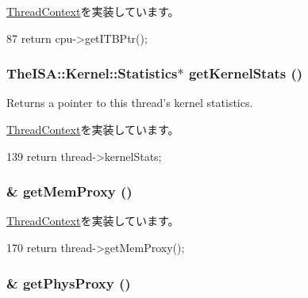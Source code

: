 \hyperlink{classThreadContext_aaae22e0dcf2f312619915bbf34509ba4}{ThreadContext}を実装しています。


\begin{DoxyCode}
87 { return cpu->getITBPtr(); }
\end{DoxyCode}
\hypertarget{classInOrderThreadContext_a3faa5e314c06241296ab582bb891a06a}{
\subsubsection[{getKernelStats}]{\setlength{\rightskip}{0pt plus 5cm}TheISA::Kernel::Statistics$\ast$ getKernelStats ()}}
\label{classInOrderThreadContext_a3faa5e314c06241296ab582bb891a06a}
Returns a pointer to this thread's kernel statistics. 

\hyperlink{classThreadContext_a85141770510cf256c27f10adece17ed5}{ThreadContext}を実装しています。


\begin{DoxyCode}
139     { return thread->kernelStats; }
\end{DoxyCode}
\hypertarget{classInOrderThreadContext_ab07f5af63c9d22e504dfe620c0a07228}{
\subsubsection[{getMemProxy}]{\& getMemProxy ()}}
\label{classInOrderThreadContext_ab07f5af63c9d22e504dfe620c0a07228}


\hyperlink{classThreadContext_a840e8764d04f2a3fb061c56738f3a874}{ThreadContext}を実装しています。


\begin{DoxyCode}
170 { return thread->getMemProxy(); }
\end{DoxyCode}
\hypertarget{classInOrderThreadContext_a01ed2104c846a24a0e18594d3a2f7de9}{
\subsubsection[{getPhysProxy}]{\& getPhysProxy ()}}
\label{classInOrderThreadContext_a01ed2104c846a24a0e18594d3a2f7de9}


